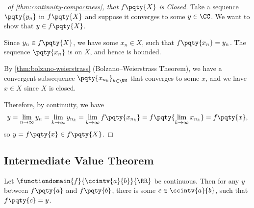\begin{proof}[\proofname\ of \autoref{thm:continuity-compactness}, that \(f\pqty{X}\) is Closed]
    Take a sequence \(\pqty{y_n}\) in \(f\pqty{X}\) and suppose it converges to some \(y \in \CC\). We want to show that \(y \in f\pqty{X}\).

    Since \(y_n \in f\pqty{X}\), we have some \(x_n \in X\), such that \(f\pqty{x_n} = y_n\). The sequence \(\pqty{x_n}\) is on \(X\), and hence is bounded.
    
    By \autoref{thm:bolzano-weierstrass} (Bolzano--Weierstrass Theorem), we have a convergent subsequence \(\pqty{x_{n_k}}_{k \in \NN}\) that converges to some \(x\), and we have \(x \in X\) since \(X\) is closed.

    Therefore, by continuity, we have
    \[
        y = \lim_{n \to \infty} y_n = \lim_{k \to \infty} y_{n_k} = \lim_{k \to \infty} f\pqty{x_{n_k}} = f\pqty{\lim_{k \to \infty} x_{n_k}} = f\pqty{x},
    \]
    so \(y = f\pqty{x} \in f\pqty{X}\).
\end{proof}

\subsection{Intermediate Value Theorem}

\begin{theorem}
    \label{thm:intermediate-value}%
    Let \(\functiondomain{f}{\ccintv{a}{b}}{\RR}\) be continuous. Then for any \(y\) between \(f\pqty{a}\) and \(f\pqty{b}\), there is some \(c \in \ccintv{a}{b}\), such that \(f\pqty{c} = y\).
\end{theorem}

